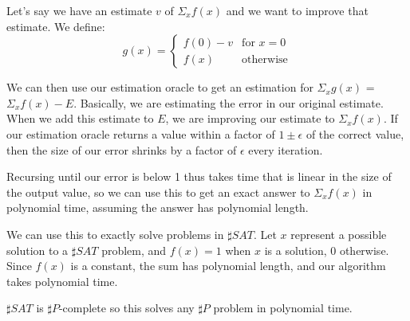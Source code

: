 \documentclass{article}
\newenvironment{problem}[2][Problem]{\begin{trivlist}
\item[\hskip \labelsep {\bfseries #1}\hskip \labelsep {\bfseries #2.}]}{\end{trivlist}}
\begin{document}
\begin{problem}{2}
  Let's say we have an estimate $v$ of $\Sigma_xf(x)$ and we want to
  improve that estimate. We define:
  \begin{equation}
    g(x) =
    \begin{cases}
      f(0) - v & \text{for } x = 0 \\
      f(x) & \text{otherwise}
    \end{cases}
  \end{equation}

  We can then use our estimation oracle to get an estimation for
  $\Sigma_xg(x)$ = $\Sigma_xf(x) - E$. Basically, we are estimating
  the error in our original estimate. When we add this estimate to
  $E$, we are improving our estimate to $\Sigma_xf(x)$. If our
  estimation oracle returns a value within a factor of
  $1 \pm \epsilon$ of the correct value, then the size of our error
  shrinks by a factor of $\epsilon$ every iteration.

  Recursing until our error is below 1 thus takes time that is linear
  in the size of the output value, so we can use this to get an exact
  answer to $\Sigma_xf(x)$ in polynomial time, assuming the answer has
  polynomial length.

  We can use this to exactly solve problems in $\sharp SAT$. Let $x$
  represent a possible solution to a $\sharp SAT$ problem, and $f(x) = 1$
  when $x$ is a solution, $0$ otherwise. Since $f(x)$ is a constant,
  the sum has polynomial length, and our algorithm takes polynomial
  time.

  $\sharp SAT$ is $\sharp P$-complete so this solves any $\sharp P$ problem in
  polynomial time.
\end{problem}
\end{document}

